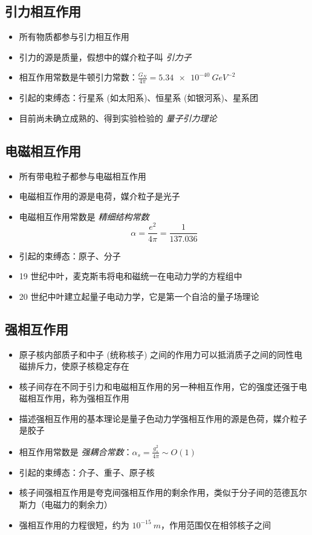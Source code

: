 \subsection{引力相互作用}

\begin{itemize}
    \item 所有物质都参与引力相互作用
    \item 引力的源是质量，假想中的媒介粒子叫 \emph{引力子}
    \item 相互作用常数是牛顿引力常数：$\frac{G_N}{4\pi}=\qty{5.34e-40}{GeV^{-2}}$
    \item 引起的束缚态：行星系 (如太阳系)、恒星系 (如银河系)、星系团
    \item 目前尚未确立成熟的、得到实验检验的 \emph{量子引力理论}
\end{itemize}

\subsection{电磁相互作用}

\begin{itemize}
    \item 所有带电粒子都参与电磁相互作用
    \item 电磁相互作用的源是电荷，媒介粒子是光子
    \item 电磁相互作用常数是 \emph{精细结构常数}
        \begin{equation}
            \alpha = \frac{e^2}{4\pi} = \frac{1}{137.036}
        \end{equation}
    \item 引起的束缚态：原子、分子
    \item 19 世纪中叶，麦克斯韦将电和磁统一在电动力学的方程组中
    \item 20 世纪中叶建立起量子电动力学，它是第一个自洽的量子场理论
\end{itemize}

\subsection{强相互作用}

\begin{itemize}
    \item 原子核内部质子和中子 (统称核子) 之间的作用力可以抵消质子之间的同性电磁排斥力，使原子核稳定存在
    \item 核子间存在不同于引力和电磁相互作用的另一种相互作用，它的强度还强于电磁相互作用，称为强相互作用
    \item 描述强相互作用的基本理论是量子色动力学强相互作用的源是色荷，媒介粒子是胶子
    \item 相互作用常数是 \emph{强耦合常数}：$\alpha_s=\frac{g_s^2}{4\pi} \sim O(1)$
    \item 引起的束缚态：介子、重子、原子核
    \item 核子间强相互作用是夸克间强相互作用的剩余作用，类似于分子间的范德瓦尔斯力（电磁力的剩余力）
    \item 强相互作用的力程很短，约为 $10^{-15}\ m$，作用范围仅在相邻核子之间
\end{itemize}

